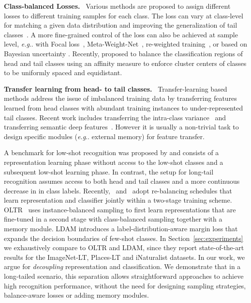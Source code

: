 \documentclass[dvipsnames]{article} \usepackage{iclr2020_conference, times}
\makeatletter
\DeclareRobustCommand\onedot{\futurelet\@let@token\@onedot}
\def\@onedot{\ifx\@let@token.\else.\null\fi\xspace}
\def\eg{\emph{e.g}\onedot} \def\Eg{\emph{E.g}\onedot}
\newcommand{\header}[1]{\noindent\textbf{#1.}~}
\newcommand{\uniform}{instance-balanced\xspace}
\newcommand{\balanced}{class-balanced\xspace}
\makeatother
\begin{document}
\header{Class-balanced Losses} Various methods are proposed to assign different losses to different training samples for each class. The loss can vary at class-level for matching a given data distribution and improving the generalization of tail classes~\citep{cui2019class, khan2017cost, cao2019learning, Khan_2019_CVPR, huang2019deep}. A more fine-grained control of the loss can also be achieved at sample level, \eg with Focal loss~\citep{lin2017focal}, Meta-Weight-Net~\citep{shu2019meta}, re-weighted training~\citep{ren18l2rw}, or based on Bayesian uncertainty \citep{Khan_2019_CVPR}. Recently, \citet{hayat2019max} proposed to balance the classification regions of head and tail classes using an affinity measure to enforce cluster centers of classes to be uniformly spaced and equidistant. 

\header{Transfer learning from head- to tail classes} Transfer-learning based methods address the issue of imbalanced training data by transferring features learned from head classes with abundant training instances to under-represented tail classes. Recent work includes transferring the intra-class variance~\citep{yin2019feature} and transferring semantic deep features~\citep{liu2019large}. However it is usually a non-trivial task to design specific modules (\eg external memory) for feature transfer.

A benchmark for low-shot recognition was proposed by \citet{hariharan2017low} and consists of a representation learning phase without access to the low-shot classes and a subsequent low-shot learning phase. In contrast, the setup for long-tail recognition assumes access to both head and tail classes and a more continuous decrease in in class labels. Recently,~\citet{liu2019large} and~\citet{cao2019learning} adopt re-balancing schedules that learn representation and classifier jointly within a two-stage training scheme. OLTR~\citep{liu2019large} uses \uniform sampling to first learn representations that are fine-tuned in a second stage with \balanced sampling together with a memory module. LDAM \citep{cao2019learning} introduces a label-distribution-aware margin loss that expands the decision boundaries of few-shot classes. In Section~\ref{sec:experiments} we exhaustively compare to OLTR and LDAM, since they report state-of-the-art results for the ImageNet-LT, Places-LT and iNaturalist datasets. In our work, we argue for \emph{decoupling} representation and classification. We demonstrate that in a long-tailed scenario, this separation allows straightforward approaches to achieve high recognition performance, without the need for designing sampling strategies, balance-aware losses or adding memory modules.
\end{document}
